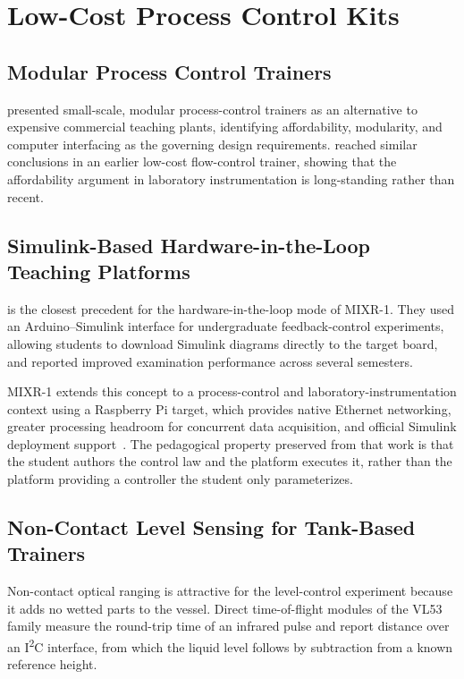 \section{Low-Cost Process Control Kits}
\label{sec:rrl-trainers}

\subsection{Modular Process Control Trainers}
\label{subsec:rrl-modular}

\citet{plett2023} presented small-scale, modular process-control trainers as an alternative to expensive commercial teaching plants, identifying affordability, modularity, and computer interfacing as the governing design requirements. \citet{rehg1998fie} reached similar conclusions in an earlier low-cost flow-control trainer, showing that the affordability argument in laboratory instrumentation is long-standing rather than recent.

\subsection{Simulink-Based Hardware-in-the-Loop Teaching Platforms}
\label{subsec:rrl-hil}

\citet{uyanik2018} is the closest precedent for the hardware-in-the-loop mode of MIXR-1. They used an Arduino--Simulink interface for undergraduate feedback-control experiments, allowing students to download Simulink diagrams directly to the target board, and reported improved examination performance across several semesters.

MIXR-1 extends this concept to a process-control and laboratory-instrumentation context using a Raspberry Pi target, which provides native Ethernet networking, greater processing headroom for concurrent data acquisition, and official Simulink deployment support~\citep{mathworks2026,rpifoundation2024}. The pedagogical property preserved from that work is that the student authors the control law and the platform executes it, rather than the platform providing a controller the student only parameterizes.

\subsection{Non-Contact Level Sensing for Tank-Based Trainers}
\label{subsec:rrl-tof}

Non-contact optical ranging is attractive for the level-control experiment because it adds no wetted parts to the vessel. Direct time-of-flight modules of the VL53 family measure the round-trip time of an infrared pulse and report distance over an I\textsuperscript{2}C interface, from which the liquid level follows by subtraction from a known reference height.

